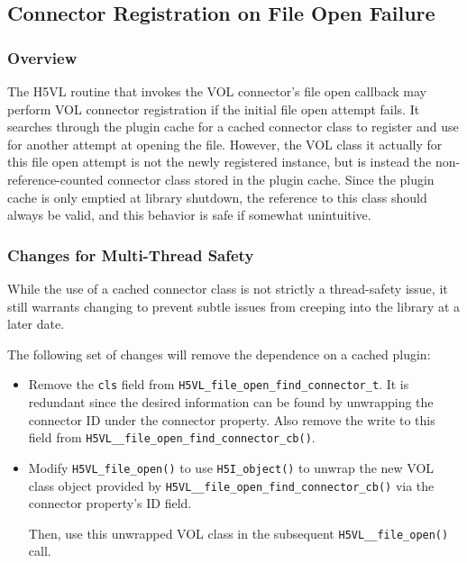 \documentclass{article}
\begin{document}
\subsection{Connector Registration on File Open Failure}

\subsubsection{Overview}

The H5VL routine that invokes the VOL connector's file open callback may perform VOL connector registration if the initial file open attempt fails. It searches through the plugin cache for a cached connector class to register and use for another attempt at opening the file. However, the VOL class it actually for this file open attempt is not the newly registered instance, but is instead the non-reference-counted connector class stored in the plugin cache. Since the plugin cache is only emptied at library shutdown, the reference to this class should always be valid, and this behavior is safe if somewhat unintuitive.

\subsubsection{Changes for Multi-Thread Safety}

While the use of a cached connector class is not strictly a thread-safety issue, it still warrants changing to prevent subtle issues from creeping into the library at a later date. 

The following set of changes will remove the dependence on a cached plugin:

\begin{itemize}
    \item Remove the \texttt{cls} field from \texttt{H5VL\_file\_open\_find\_connector\_t}. It is redundant since the desired information can be found by unwrapping the connector ID under the connector property. Also remove the write to this field from \texttt{H5VL\_\_file\_open\_find\_connector\_cb()}.

    \item Modify \texttt{H5VL\_file\_open()} to use \texttt{H5I\_object()} to unwrap the new VOL class object provided by \texttt{H5VL\_\_file\_open\_find\_connector\_cb()} via the connector property's ID field. 

    Then, use this unwrapped VOL class in the subsequent \texttt{H5VL\_\_file\_open()} call.
\end{itemize}
\end{document}
